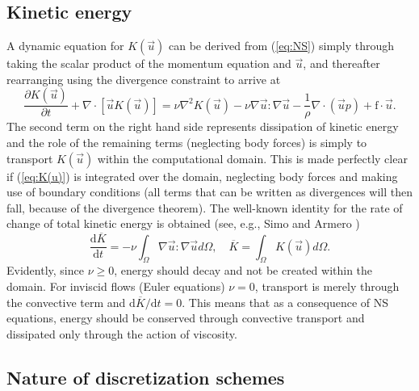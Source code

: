 \subsection{Kinetic energy}
\label{sec:kinetic}
A dynamic equation for $K(\vec{u})$ can be derived from (\ref{eq:NS}) simply through taking the scalar product of the momentum equation and $\vec{u}$, and thereafter rearranging using the divergence constraint to arrive at
\begin{equation}
 \frac{\partial K(\vec{u})}{\partial t} + \nabla \cdot [\vec{u}K(\vec{u})] = \nu \nabla^2 K(\vec{u}) -\nu \nabla \vec{u} : \nabla \vec{u} - \frac{1}{\rho}\nabla \cdot \left(\vec{u}p \right) +\text{f}\cdot \vec{u}. 
 \label{eq:K(u)}
\end{equation}
The second term on the right hand side represents dissipation of kinetic energy and the role of the remaining terms (neglecting body forces) is simply to transport $K(\vec{u})$ within the computational domain. This is made perfectly clear if (\ref{eq:K(u)}) is integrated over the domain, neglecting body forces and making use of boundary conditions (all terms that can be written as divergences will then fall, because of the divergence theorem). The well-known identity for the rate of change of total kinetic energy is obtained (see, e.g., Simo and Armero \cite{simo94})
\begin{equation}
 \frac{\text{d} \overline{K} }{\text{d} t} = - \nu \int_\Omega \nabla \vec{u} : \nabla \vec{u} d\Omega,
\quad \overline{K} = \int_{\Omega} K(\vec{u})d\Omega .
\end{equation}
Evidently, since $\nu \ge 0$, energy should decay and not be created within the domain. For inviscid flows (Euler equations) $\nu=0$, transport is merely through the convective term and $\text{d} \overline{K}/\text{d} t = 0$. This means that as a consequence of NS equations, energy should be conserved through convective transport and dissipated only through the action of viscosity.
\subsection{Nature of discretization schemes}
\label{sec:dissipative:dispersive}

